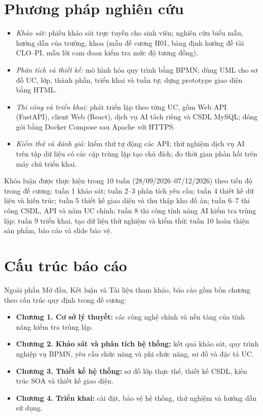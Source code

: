 \documentclass[../main.tex]{subfiles}
\begin{document}
\section*{Phương pháp nghiên cứu}

\begin{itemize}
    \item \textit{Khảo sát:} phiếu khảo sát trực tuyến cho sinh viên; nghiên cứu biểu mẫu, hướng dẫn của trường, khoa (mẫu đề cương H01, bảng định hướng đề tài CLO--PI, mẫu lời cam đoan kiểm tra mức độ tương đồng).
    \item \textit{Phân tích và thiết kế:} mô hình hóa quy trình bằng BPMN; dùng UML cho sơ đồ UC, lớp, thành phần, triển khai và tuần tự; dựng prototype giao diện bằng HTML.
    \item \textit{Thi công và triển khai:} phát triển lặp theo từng UC, gồm Web API (FastAPI), client Web (React), dịch vụ AI tách riêng và CSDL MySQL; đóng gói bằng Docker Compose sau Apache với HTTPS.
    \item \textit{Kiểm thử và đánh giá:} kiểm thử tự động các API; thử nghiệm dịch vụ AI trên tập dữ liệu có các cặp trùng lặp tạo chủ đích; đo thời gian phản hồi trên máy chủ triển khai.
\end{itemize}

Khóa luận được thực hiện trong 10 tuần (28/09/2026--07/12/2026) theo tiến độ trong đề cương: tuần 1 khảo sát; tuần 2--3 phân tích yêu cầu; tuần 4 thiết kế dữ liệu và kiến trúc; tuần 5 thiết kế giao diện và thu thập kho đồ án; tuần 6--7 thi công CSDL, API và năm UC chính; tuần 8 thi công tính năng AI kiểm tra trùng lặp; tuần 9 triển khai, tạo dữ liệu thử nghiệm và kiểm thử; tuần 10 hoàn thiện sản phẩm, báo cáo và slide bảo vệ.

\section*{Cấu trúc báo cáo}

Ngoài phần Mở đầu, Kết luận và Tài liệu tham khảo, báo cáo gồm bốn chương theo cấu trúc quy định trong đề cương:
\begin{itemize}
    \item \textbf{Chương 1. Cơ sở lý thuyết:} các công nghệ chính và nền tảng của tính năng kiểm tra trùng lặp.
    \item \textbf{Chương 2. Khảo sát và phân tích hệ thống:} kết quả khảo sát, quy trình nghiệp vụ BPMN, yêu cầu chức năng và phi chức năng, sơ đồ và đặc tả UC.
    \item \textbf{Chương 3. Thiết kế hệ thống:} sơ đồ lớp thực thể, thiết kế CSDL, kiến trúc SOA và thiết kế giao diện.
    \item \textbf{Chương 4. Triển khai:} cài đặt, bảo vệ hệ thống, thử nghiệm và hướng dẫn sử dụng.
\end{itemize}
\end{document}
